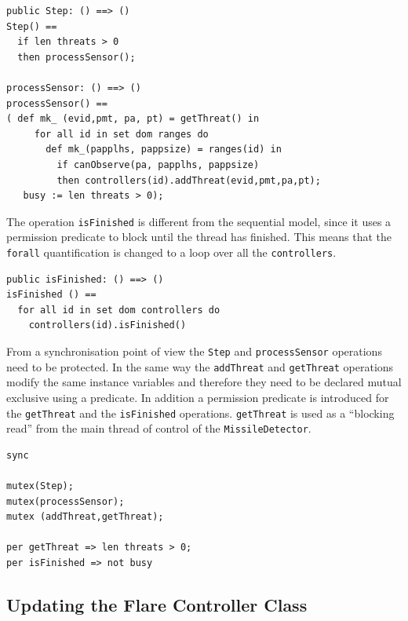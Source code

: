 \documentclass{overturerepchap}
\begin{document}
\begin{lstlisting} 
public Step: () ==> ()
Step() ==
  if len threats > 0
  then processSensor();

processSensor: () ==> ()
processSensor() ==
( def mk_ (evid,pmt, pa, pt) = getThreat() in
     for all id in set dom ranges do
       def mk_(papplhs, pappsize) = ranges(id) in
         if canObserve(pa, papplhs, pappsize)
         then controllers(id).addThreat(evid,pmt,pa,pt);
   busy := len threats > 0);
\end{lstlisting}

The operation \texttt{isFinished} is different from the sequential
model, since it uses a permission predicate to block until the thread
has finished. This means that the \texttt{forall} quantification is
changed to a loop over all the \texttt{controllers}.

\begin{lstlisting}
public isFinished: () ==> ()
isFinished () ==
  for all id in set dom controllers do
    controllers(id).isFinished()
\end{lstlisting}

From a synchronisation point of view the \texttt{Step} and \texttt{processSensor} operations need to be protected. In the same way the \texttt{addThreat} and 
\texttt{getThreat} operations modify the same instance variables and
therefore they need to be declared mutual exclusive using a
{\bf{}} 
predicate. In addition a permission predicate is introduced for the
\texttt{getThreat} and the \texttt{isFinished} operations. 
\texttt{getThreat} is used as a ``blocking read'' from the main
thread of control of the \texttt{MissileDetector}.

\begin{lstlisting}
sync

mutex(Step);
mutex(processSensor);
mutex (addThreat,getThreat);

per getThreat => len threats > 0;
per isFinished => not busy
\end{lstlisting}

\subsection{Updating the Flare Controller Class}

%
\end{document}

